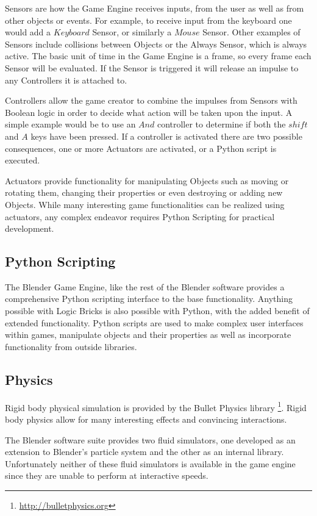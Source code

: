 Sensors are how the Game Engine receives inputs, from the user as well as from
other objects or events. For example, to receive input from the keyboard one
would add a $Keyboard$ Sensor, or similarly a $Mouse$ Sensor. Other examples of
Sensors include collisions between Objects or the Always Sensor, which is
always active. The basic unit of time in the Game Engine is a frame,
so every frame each Sensor will be evaluated. If the Sensor is triggered it
will release an impulse to any Controllers it is attached to.


Controllers allow the game creator to combine the impulses from Sensors with
Boolean logic in order to decide what action will be taken upon the input. A
simple example would be to use an $And$ controller to determine if both the
$shift$ and $A$ keys have been pressed. If a controller is activated there are
two possible consequences, one or more Actuators are activated, or a Python
script is executed.


Actuators provide functionality for manipulating Objects such as moving or
rotating them, changing their properties or even destroying or adding new
Objects. While many interesting game functionalities can be realized using
actuators, any complex endeavor requires Python Scripting for practical
development.

\subsection{Python Scripting}
The Blender Game Engine, like the rest of the Blender software provides a
comprehensive Python scripting interface to the base functionality. Anything
possible with Logic Bricks is also possible with Python, with the added benefit
of extended functionality. Python scripts are used to make complex user
interfaces within games, manipulate objects and their properties as well as
incorporate functionality from outside libraries.


\subsection{Physics}
Rigid body physical simulation is provided by the Bullet Physics library
\footnote{\url{http://bulletphysics.org}}. Rigid body physics allow for many interesting
effects and convincing interactions. 

The Blender software suite provides two fluid simulators, one developed as an
extension to Blender's particle system and the other as an internal library.
Unfortunately neither of these fluid simulators is available in the game engine
since they are unable to perform at interactive speeds.



